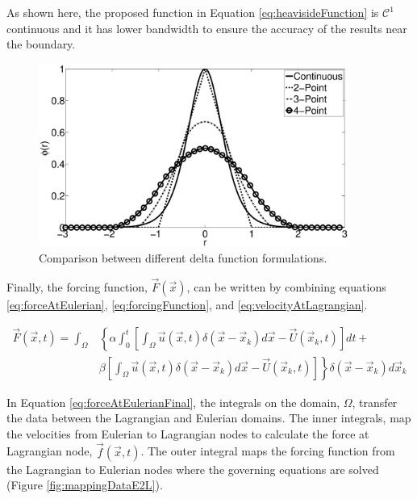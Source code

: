\documentclass[12pt]{aiaa-pretty}
\begin{document}
As shown here, the proposed function in Equation \eqref{eq:heavisideFunction} is $\mathcal{C}^1$ continuous and it has lower bandwidth to ensure the accuracy of the results near the boundary.

%
\begin{figure}[H]
	\centering
	\includegraphics[height=6.0cm]{figure/heaviside_comparison.eps}
	\caption{Comparison between different delta function formulations.}
	\label{fig:heavisideComparison}
\end{figure}
%

Finally, the forcing function, $\vec{F}(\vec{x})$, can be written by combining equations \eqref{eq:forceAtEulerian}, \eqref{eq:forcingFunction}, and \eqref{eq:velocityAtLagrangian}.

%
\begin{equation}
\begin{aligned}\label{eq:forceAtEulerianFinal}
	\vec{F}(\vec{x}, t) = 
	\int_\Omega 
	&\left\{
 	\alpha \int_0^t
	\left[
	\int_\Omega \vec{u} (\vec{x}, t) \delta(\vec{x} - \vec{x}_k) d\vec{x} - \vec{U}\left( \vec{x}_k, t \right)
	\right]dt + \right. \\
	&\left.
	\beta \left[
	\int_\Omega \vec{u} (\vec{x}, t) \delta(\vec{x} - \vec{x}_k) d\vec{x} - \vec{U}\left( \vec{x}_k, t \right)
	\right]
	\right\} \delta(\vec{x} - \vec{x}_k) d\vec{x}_k
\end{aligned}
\end{equation}
%

In Equation \eqref{eq:forceAtEulerianFinal}, the integrals on the domain, $\Omega$, transfer the data between the Lagrangian and Eulerian domains. The inner integrals, map the velocities from Eulerian to Lagrangian nodes to calculate the force at Lagrangian node, $\vec{f}\left( \vec{x}, t \right)$. The outer integral maps the forcing function from the Lagrangian to Eulerian nodes where the governing equations are solved (Figure \ref{fig:mappingDataE2L}).
\end{document}
